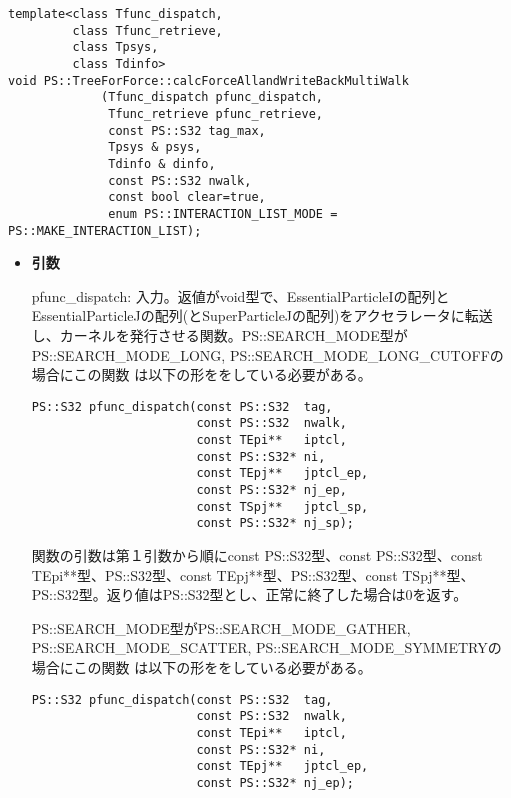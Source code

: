 \begin{screen}
\begin{verbatim}
template<class Tfunc_dispatch,
         class Tfunc_retrieve,
         class Tpsys,
         class Tdinfo>
void PS::TreeForForce::calcForceAllandWriteBackMultiWalk
             (Tfunc_dispatch pfunc_dispatch,
              Tfunc_retrieve pfunc_retrieve,
              const PS::S32 tag_max,
              Tpsys & psys,
              Tdinfo & dinfo,
              const PS::S32 nwalk,
              const bool clear=true,
              enum PS::INTERACTION_LIST_MODE = PS::MAKE_INTERACTION_LIST);
\end{verbatim}
\end{screen}

\begin{itemize}

\item {\bf 引数}

pfunc\_dispatch: 入力。返値がvoid型で、EssentialParticleIの配列と
EssentialParticleJの配列(とSuperParticleJの配列)をアクセラレータに転送
し、カーネルを発行させる関数。PS::SEARCH\_MODE型が
PS::SEARCH\_MODE\_LONG, PS::SEARCH\_MODE\_LONG\_CUTOFFの場合にこの関数
は以下の形ををしている必要がある。

\begin{verbatim}
PS::S32 pfunc_dispatch(const PS::S32  tag,
                       const PS::S32  nwalk,
                       const TEpi**   iptcl,
                       const PS::S32* ni,
                       const TEpj**   jptcl_ep,
                       const PS::S32* nj_ep,
                       const TSpj**   jptcl_sp,
                       const PS::S32* nj_sp);
\end{verbatim}

関数の引数は第１引数から順にconst PS::S32型、const PS::S32型、const
TEpi**型、PS::S32型、const TEpj**型、PS::S32型、const TSpj**型、
PS::S32型。返り値はPS::S32型とし、正常に終了した場合は0を返す。


PS::SEARCH\_MODE型がPS::SEARCH\_MODE\_GATHER,
PS::SEARCH\_MODE\_SCATTER, PS::SEARCH\_MODE\_SYMMETRYの場合にこの関数
は以下の形ををしている必要がある。

\begin{verbatim}
PS::S32 pfunc_dispatch(const PS::S32  tag,
                       const PS::S32  nwalk,
                       const TEpi**   iptcl,
                       const PS::S32* ni,
                       const TEpj**   jptcl_ep,
                       const PS::S32* nj_ep);
\end{verbatim}


\end{itemize}
